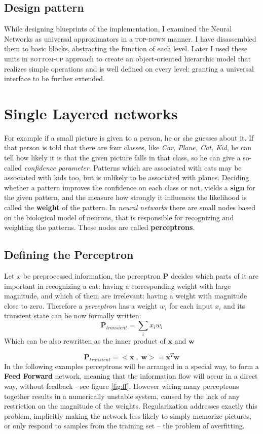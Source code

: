 \subsection{Design pattern} While designing blueprints of the implementation, I examined the Neural Networks as universal approximators in a \textsc{top-down} manner.
I have disassembled them to basic blocks, abstracting the function of each level.
Later I used these units in \textsc{bottom-up} approach to create an object-oriented hierarchic model that realizes simple operations and is well defined on every level: granting a universal interface to be further extended.


\section{Single Layered networks}
For example if a small picture is given to a person, he or she guesses about it. If that person is told that there are four classes, 
like \emph{Car, Plane, Cat, Kid}, he can tell how likely it is that 
the given picture falls in that class, so he can give a so-called \emph{confidence parameter}.
Patterns which are associated with cats may be associated with kids too, but is unlikely to be associated with planes. Deciding whether a pattern improves the confidence on each class or not, yields a \textbf{sign} for the given pattern, and the measure how strongly it influences the likelihood is called the \textbf{weight} of the pattern.
In \emph{neural networks} there are small nodes based on the biological model of neurons, that is responsible for recognizing and weighting the patterns. These nodes are called \textbf{perceptrons}. 

\subsection{Defining the Perceptron} 
Let $x$ be preprocessed information, the perceptron $\mathbf{P}$ decides which parts of it are important in recognizing a cat: having a corresponding weight with large magnitude, and which of them are irrelevant: having a weight with magnitude close to zero. 
Therefore a \emph{perceptron} has a weight $w_i$ for each input $x_i$ and its transient state can be now formally written:
$$
	\mathbf{P}_{transient}=\sum_i x_i w_i
$$
Which can be also rewritten as the inner product of $\mathbf{x}$ and $\mathbf{w}$

$$
	\mathbf{P}_{transient}= <\mathbf{x} \;,\; \mathbf{w}>=\mathbf{x}^T\mathbf{w}
$$
In the following examples perceptrons will be arranged in a special way, to form a \textbf{Feed Forward} network, meaning that the information flow will occur in a direct way, without feedback - see figure \ref{fig:ff}.
However wiring many perceptrons together results in a numerically unstable system, caused by the lack of any restriction on the magnitude of the weights.
Regularization addresses exactly this problem, implicitly making the network less likely to simply memorize pictures, or only respond to samples from the training set -- the problem of overfitting.

